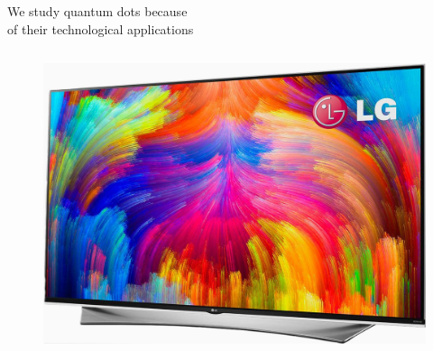 \documentclass[12pt,usenames,dvipsnames]{beamer}
\begin{document}
\begin{frame}{We study quantum dots because \\ of their technological applications}
\begin{columns}
    \begin{column}{0.25\textwidth}
      \begin{figure}
        \includegraphics[width=\textwidth]{figures/devices/quantum_dot_tv.jpg}
      \end{figure}
    \end{column}


\end{columns}
\end{frame}
\end{document}
